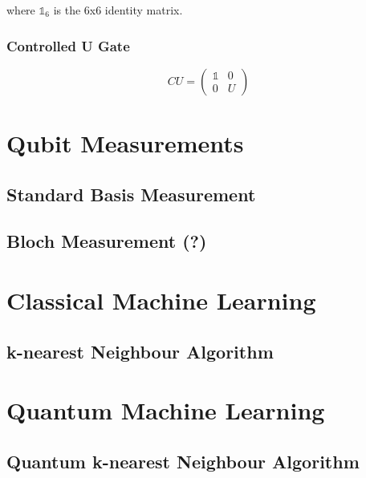 where $\mathbb{1}_6$ is the 6x6 identity matrix.

\subsubsection{Controlled U Gate}
\label{subsubsubsec:controlledugate}

\begin{equation}
CU = \begin{pmatrix}
 \mathbb{1} & 0 \\ 
 0 & U
 \end{pmatrix}
\end{equation}


\section{Qubit Measurements}
\label{subsec:qubitmeasurements}

\subsection{Standard Basis Measurement}
\label{subsubsec:standardbasismeasurement}

\subsection{Bloch Measurement (?)}
\label{subsubsec:blochmeasurement}



\section{Classical Machine Learning}
\label{subsec:classicalmachinelearning}

\subsection{k-nearest Neighbour Algorithm}
\label{subsubsec:knearestneighbour}

\section{Quantum Machine Learning}
\label{subsec:quantummachinelearning}

\subsection{Quantum k-nearest Neighbour Algorithm}
\label{subsubsec:quantumknearestneighbour}